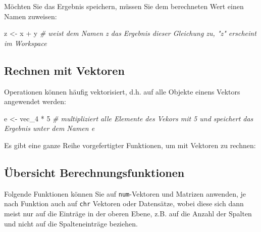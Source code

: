 \documentclass[
]{book}
\newenvironment{Shaded}{\begin{snugshade}}{\end{snugshade}}
\newcommand{\CommentTok}[1]{\textcolor[rgb]{0.56,0.35,0.01}{\textit{#1}}}
\newcommand{\DecValTok}[1]{\textcolor[rgb]{0.00,0.00,0.81}{#1}}
\newcommand{\NormalTok}[1]{#1}
\newcommand{\OtherTok}[1]{\textcolor[rgb]{0.56,0.35,0.01}{#1}}
\newcommand{\SpecialCharTok}[1]{\textcolor[rgb]{0.00,0.00,0.00}{#1}}
\theoremstyle{definition}
\theoremstyle{definition}
\theoremstyle{definition}
\theoremstyle{definition}
\theoremstyle{remark}
\begin{document}
Möchten Sie das Ergebnis speichern, müssen Sie dem berechneten Wert einen Namen zuweisen:

\begin{Shaded}
\begin{Highlighting}[]
\NormalTok{z }\OtherTok{\textless{}{-}}\NormalTok{ x }\SpecialCharTok{+}\NormalTok{ y  }\CommentTok{\# weist dem Namen z das Ergebnis dieser Gleichung zu, "z" erscheint im Workspace}
\end{Highlighting}
\end{Shaded}

\hypertarget{rechnen-mit-vektoren}{%
\subsection{Rechnen mit Vektoren}\label{rechnen-mit-vektoren}}

Operationen können häufig vektorisiert, d.h. auf alle Objekte einens Vektors angewendet werden:

\begin{Shaded}
\begin{Highlighting}[]
\NormalTok{e }\OtherTok{\textless{}{-}}\NormalTok{ vec\_4 }\SpecialCharTok{*} \DecValTok{5} \CommentTok{\# multipliziert alle Elemente des Vekors mit 5 und speichert das Ergebnis unter dem Namen e}
\end{Highlighting}
\end{Shaded}

Es gibt eine ganze Reihe vorgefertigter Funktionen, um mit Vektoren zu rechnen:

\hypertarget{uxfcbersicht-berechnungsfunktionen}{%
\subsection{Übersicht Berechnungsfunktionen}\label{uxfcbersicht-berechnungsfunktionen}}

Folgende Funktionen können Sie auf \texttt{num}-Vektoren und Matrizen anwenden, je nach Funktion auch auf \texttt{chr} Vektoren oder Datensätze, wobei diese sich dann meist nur auf die Einträge in der oberen Ebene, z.B. auf die Anzahl der Spalten und nicht auf die Spalteneinträge beziehen.
\end{document}
